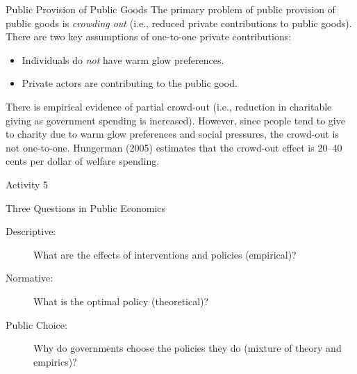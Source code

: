 \documentclass[10pt]{extarticle}
\begin{document}
  \begin{problem}{Public Provision of Public Goods}
    The primary problem of public provision of public goods is \textit{crowding out} (i.e., reduced private contributions to public goods). There are two key assumptions of one-to-one private contributions:
    \begin{itemize}
      \item Individuals do \textit{not} have warm glow preferences.
      \item Private actors are contributing to the public good.
    \end{itemize}
    There is empirical evidence of partial crowd-out (i.e., reduction in charitable giving as government spending is increased). However, since people tend to give to charity due to warm glow preferences and social pressures, the crowd-out is not one-to-one. Hungerman (2005) estimates that the crowd-out effect is 20–40 cents per dollar of welfare spending.
  \end{problem}
  \begin{problem}{Activity 5}
    \begin{tcbraster}[raster columns = 1,colframe = black!75!white,colback=white]
    \end{tcbraster}
  \end{problem}
  \begin{problem}{Three Questions in Public Economics}
    \begin{description}
      \item[Descriptive:] What are the effects of interventions and policies (empirical)?
      \item[Normative:] What is the optimal policy (theoretical)?
      \item[Public Choice:] Why do governments choose the policies they do (mixture of theory and empirics)?
    \end{description}
  \end{problem}
\end{document}
